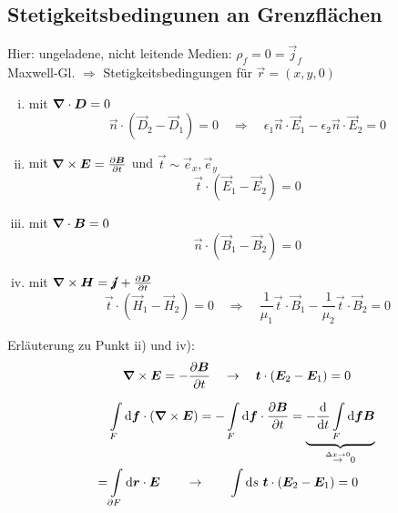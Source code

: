 \subsection{Stetigkeitsbedingunen an Grenzflächen}

Hier: ungeladene, nicht leitende Medien: $ \rho_f = 0 = \vec{j}_f $\\[5pt]
Maxwell-Gl. $ \Rightarrow $ Stetigkeitsbedingungen für $ \vec{r} = (x,y,0) $
\begin{enumerate}[i)]
	\item mit $ \bm{\nabla} \cdot \bm{D} = 0 $
	\begin{equation*}
	\vec{n} \cdot (\vec{D}_2 - \vec{D}_1) = 0 \quad \Rightarrow \quad \epsilon_1 \vec{n} \cdot \vec{E}_1 - \epsilon_2 \vec{n} \cdot \vec{E}_2 = 0
	\end{equation*}
	\item mit $ \bm{\nabla} \times \bm{E} = \frac{\partial \bm{B}}{\partial t} $ und $ \vec{t} \sim \vec{e}_x, \vec{e}_y $
	\begin{equation*}
	\vec{t} \cdot (\vec{E}_1 - \vec{E}_2) = 0
	\end{equation*}
	\item mit $ \bm{\nabla} \cdot \bm{B} = 0 $
	\begin{equation*}
	\vec{n} \cdot (\vec{B}_1 - \vec{B}_2) = 0
	\end{equation*}
	\item mit $ \bm{\nabla} \times \bm{H} = \cancel{\bm{j}} + \frac{\partial \bm{D}}{\partial t} $
	\begin{equation*}
	\vec{t} \cdot (\vec{H}_1 - \vec{H}_2) = 0 \quad \Rightarrow \quad \frac{1}{\mu_1} \vec{t} \cdot \vec{B}_1 - \frac{1}{\mu_2} \vec{t} \cdot \vec{B}_2 = 0
	\end{equation*}
\end{enumerate}
Erläuterung zu Punkt ii) und iv):
\begin{equation*}
\bm{\nabla} \times \bm{E} = - \frac{\partial \bm{B}}{\partial t} \quad \rightarrow \quad \bm{t} \cdot (\bm{E}_2 - \bm{E}_1) = 0
\end{equation*}
\begin{minipage}{.6\linewidth}
	\begin{align*}
	&\int \limits _F \textrm{d} \bm{f} \cdot (\bm{\nabla} \times \bm{E}) = - \int \limits_F \textrm{d} \bm{f} \cdot \frac{\partial \bm{B}}{\partial t} = \underbrace{- \frac{\textrm{d} }{\textrm{d} t} \int \limits_F \textrm{d} \bm{f} \bm{B}}_{\overset{\Delta x \to 0}{\rightarrow} 0} \\
	= & \int \limits_{\partial F} \textrm{d} \bm{r} \cdot \bm{E} \qquad \rightarrow \qquad \int \textrm{d} s \ \bm{t} \cdot (\bm{E}_2 - \bm{E}_1) = 0
	\end{align*}
	\vspace{5pt}
\end{minipage}%
